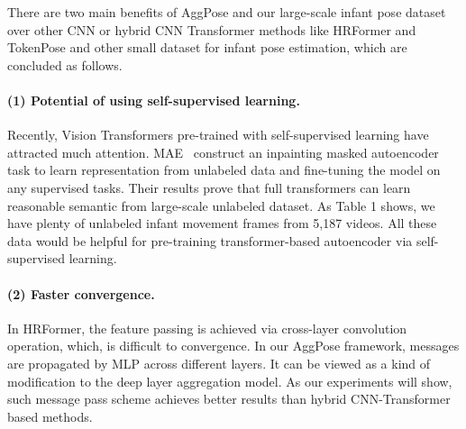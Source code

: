 \documentclass{article}
\begin{document}
There are two main benefits of AggPose and our large-scale infant pose dataset over other CNN or hybrid CNN Transformer methods like HRFormer and TokenPose and other small dataset for infant pose estimation, which are concluded as follows.

\paragraph{(1) Potential of using self-supervised learning.} Recently, Vision Transformers pre-trained with self-supervised learning have attracted much attention. MAE~\cite{he2021masked} construct an inpainting masked autoencoder task to learn representation from unlabeled data and fine-tuning the model on any supervised tasks. Their results prove that full transformers can learn reasonable semantic from large-scale unlabeled dataset. As Table 1 shows, we have plenty of unlabeled infant movement frames from 5,187 videos. All these data would be helpful for pre-training transformer-based autoencoder via self-supervised learning.

\paragraph{(2) Faster convergence.} In HRFormer, the feature passing is achieved via cross-layer convolution operation, which, is difficult to convergence. In our AggPose framework, messages are propagated by MLP across different layers. It can be viewed as a kind of modification to the deep layer aggregation model. As our experiments will show, such message pass scheme achieves better results than hybrid CNN-Transformer based methods.
\end{document}

